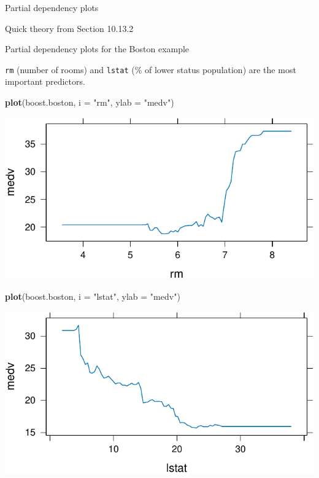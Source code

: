 \documentclass[
  10pt,
  ignorenonframetext,
]{beamer}
\newenvironment{Shaded}{\begin{snugshade}}{\end{snugshade}}
\newcommand{\AttributeTok}[1]{\textcolor[rgb]{0.13,0.29,0.53}{#1}}
\newcommand{\FunctionTok}[1]{\textcolor[rgb]{0.13,0.29,0.53}{\textbf{#1}}}
\newcommand{\NormalTok}[1]{#1}
\newcommand{\StringTok}[1]{\textcolor[rgb]{0.31,0.60,0.02}{#1}}
\begin{document}
\begin{frame}
\begin{block}{Partial dependency plots}
\protect\hypertarget{partial-dependency-plots}{}
\(~\)

Quick theory from Section 10.13.2
\end{block}
\end{frame}

\begin{frame}[fragile]
\begin{block}{Partial dependency plots for the Boston example}
\protect\hypertarget{partial-dependency-plots-for-the-boston-example}{}
\(~\)

\texttt{rm} (number of rooms) and \texttt{lstat} (\% of lower status
population) are the most important predictors.

\vspace{2mm}

\scriptsize

\begin{Shaded}
\begin{Highlighting}[]
\FunctionTok{plot}\NormalTok{(boost.boston, }\AttributeTok{i =} \StringTok{"rm"}\NormalTok{, }\AttributeTok{ylab =} \StringTok{"medv"}\NormalTok{)}
\end{Highlighting}
\end{Shaded}

\begin{center}\includegraphics[width=0.4\linewidth]{9TreeBost_files/figure-beamer/boston7-1} \end{center}

\begin{Shaded}
\begin{Highlighting}[]
\FunctionTok{plot}\NormalTok{(boost.boston, }\AttributeTok{i =} \StringTok{"lstat"}\NormalTok{, }\AttributeTok{ylab =} \StringTok{"medv"}\NormalTok{)}
\end{Highlighting}
\end{Shaded}

\begin{center}\includegraphics[width=0.4\linewidth]{9TreeBost_files/figure-beamer/boston7-2} \end{center}
\end{block}
\end{frame}
\end{document}
